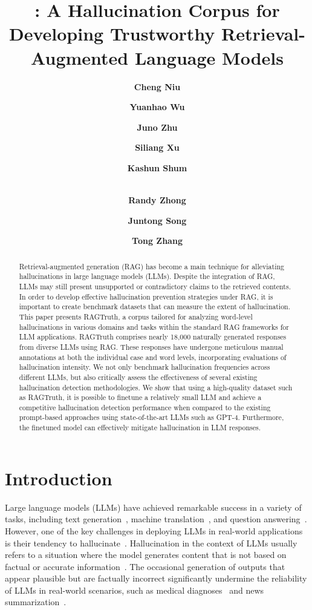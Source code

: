\documentclass[11pt]{article}
\title{
\CorpusName: 
A Hallucination Corpus for Developing Trustworthy Retrieval-Augmented Language Models
}
\author[1]{\textbf{Cheng Niu}}
\author[1]{\textbf{Yuanhao Wu}}
\author[1]{\textbf{Juno Zhu}}
\author[1]{\textbf{Siliang Xu}}
\author[1]{\textbf{Kashun Shum}}
\author[1]{\\\textbf{Randy Zhong}}
\author[1]{\textbf{Juntong Song}}
\author[2]{\textbf{Tong Zhang}}
\affil[1]{NewsBreak}
\affil[2]{University of Illinois Urbana-Champaign}
\affil[ ]{ {cheng.niu@newsbreak.com}}
\newcommand{\CorpusName}{RAGTruth}
\begin{document}
\maketitle
\begin{abstract}

Retrieval-augmented generation (RAG) has become a main technique for alleviating hallucinations in large language models (LLMs). 
Despite the integration of RAG, LLMs may still present unsupported or contradictory claims to the retrieved contents. 
In order to develop effective hallucination prevention strategies under RAG, it is important to create benchmark datasets that can measure the extent of hallucination. 
This paper presents {\CorpusName}, a corpus tailored for analyzing word-level hallucinations in various domains and tasks within the standard RAG frameworks for LLM applications. 
{\CorpusName} comprises nearly 18,000 naturally generated responses from diverse LLMs using RAG. 
These responses have undergone meticulous manual annotations at both the individual case and word levels, incorporating evaluations of hallucination intensity. 
We not only benchmark hallucination frequencies across different LLMs, but also critically assess the effectiveness of several existing hallucination detection methodologies. 
We show that using a high-quality dataset such as {\CorpusName}, it is possible to finetune a relatively small LLM and achieve a competitive hallucination detection performance when compared to the existing prompt-based approaches using state-of-the-art LLMs such as GPT-4. Furthermore, the finetuned model can effectively mitigate hallucination in LLM responses.
\end{abstract}

\section{Introduction}
Large language models (LLMs) have achieved remarkable success in a variety of tasks, including text generation~\cite{li2022pretrained}, machine translation~\cite{kocmi2023large}, and question answering~\cite{zhao2023survey}. However, one of the key challenges in deploying LLMs in real-world applications is their tendency to hallucinate~\cite{kaddour2023challenges}.
Hallucination in the context of LLMs usually refers to a situation where the model generates content that is not based on factual or accurate information~\cite{Rawte2023}. 
The occasional generation of outputs that appear plausible but are factually incorrect significantly undermine the reliability of LLMs in real-world scenarios, such as medical diagnoses~\cite{pal2023medhalt} and news summarization~\cite{shen2023why}.
\end{document}

